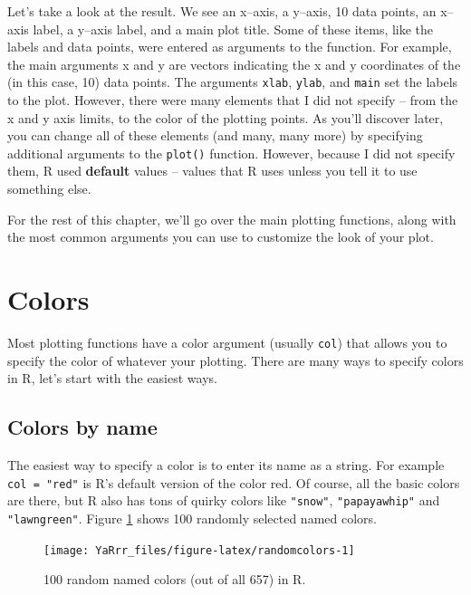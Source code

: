 \documentclass[]{book}
\theoremstyle{definition}
\theoremstyle{definition}
\theoremstyle{remark}
\begin{document}
Let's take a look at the result. We see an x--axis, a y--axis, 10 data
points, an x--axis label, a y--axis label, and a main plot title. Some
of these items, like the labels and data points, were entered as
arguments to the function. For example, the main arguments x and y are
vectors indicating the x and y coordinates of the (in this case, 10)
data points. The arguments \texttt{xlab}, \texttt{ylab}, and
\texttt{main} set the labels to the plot. However, there were many
elements that I did not specify -- from the x and y axis limits, to the
color of the plotting points. As you'll discover later, you can change
all of these elements (and many, many more) by specifying additional
arguments to the \texttt{plot()} function. However, because I did not
specify them, R used \textbf{default} values -- values that R uses
unless you tell it to use something else.

For the rest of this chapter, we'll go over the main plotting functions,
along with the most common arguments you can use to customize the look
of your plot.

\section{Colors}\label{colors}

Most plotting functions have a color argument (usually \texttt{col})
that allows you to specify the color of whatever your plotting. There
are many ways to specify colors in R, let's start with the easiest ways.

\subsection{Colors by name}\label{colors-by-name}

The easiest way to specify a color is to enter its name as a string. For
example \texttt{col\ =\ "red"} is R's default version of the color red.
Of course, all the basic colors are there, but R also has tons of quirky
colors like \texttt{"snow"}, \texttt{"papayawhip"} and
\texttt{"lawngreen"}. Figure \ref{fig:randomcolors} shows 100 randomly
selected named colors.

\begin{figure}

{\centering \texttt{[image: YaRrr\_files/figure-latex/randomcolors-1]} 

}

\caption{100 random named colors (out of all 657) in R.}\label{fig:randomcolors}
\end{figure}
\end{document}
